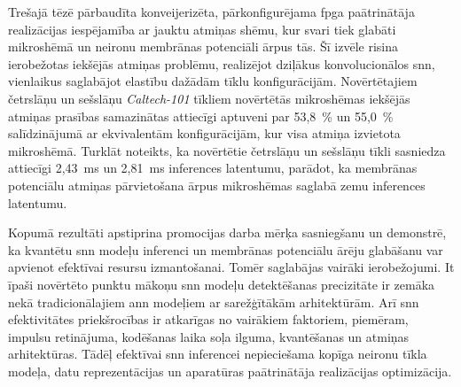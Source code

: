 Trešajā tēzē pārbaudīta konveijerizēta, pārkonfigurējama \Gls{fpga} paātrinātāja realizācijas iespējamība ar jauktu atmiņas shēmu, kur
svari tiek glabāti mikroshēmā un neironu membrānas potenciāli ārpus tās. Šī izvēle risina ierobežotas iekšējās atmiņas
problēmu, realizējot dziļākus konvolucionālos \Gls{snn}, vienlaikus saglabājot elastību dažādām tīklu konfigurācijām.
Novērtētajiem četrslāņu un sešslāņu \textit{Caltech-101} tīkliem novērtētās mikroshēmas iekšējās atmiņas prasības samazinātas
attiecīgi aptuveni par 53,8~\% un 55,0~\% salīdzinājumā ar ekvivalentām konfigurācijām, kur visa atmiņa izvietota mikroshēmā.
Turklāt noteikts, ka novērtētie četrslāņu un sešslāņu tīkli sasniedza attiecīgi 2,43~ms un 2,81~ms inferences latentumu,
parādot, ka membrānas potenciālu atmiņas pārvietošana ārpus mikroshēmas saglabā zemu inferences latentumu.

Kopumā rezultāti apstiprina promocijas darba mērķa sasniegšanu un demonstrē, ka kvantētu \Gls{snn} modeļu inferenci un
membrānas potenciālu ārēju glabāšanu var apvienot efektīvai resursu izmantošanai.
Tomēr saglabājas vairāki ierobežojumi. It īpaši
novērtēto punktu mākoņu \Gls{snn} modeļu detektēšanas precizitāte ir zemāka nekā tradicionālajiem \Gls{ann} modeļiem ar
sarežģītākām arhitektūrām. Arī \Gls{snn} efektivitātes priekšrocības ir atkarīgas no vairākiem faktoriem, piemēram, impulsu
retinājuma, kodēšanas laika soļa ilguma, kvantēšanas un atmiņas arhitektūras. Tādēļ efektīvai \Gls{snn} inferencei
nepieciešama kopīga neironu tīkla modeļa, datu reprezentācijas un aparatūras paātrinātāja realizācijas optimizācija.
